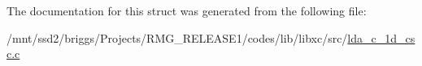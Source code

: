The documentation for this struct was generated from the following file\-:\begin{DoxyCompactItemize}
\item 
/mnt/ssd2/briggs/\-Projects/\-R\-M\-G\-\_\-\-R\-E\-L\-E\-A\-S\-E1/codes/lib/libxc/src/\hyperlink{lda__c__1d__csc_8c}{lda\-\_\-c\-\_\-1d\-\_\-csc.\-c}\end{DoxyCompactItemize}
